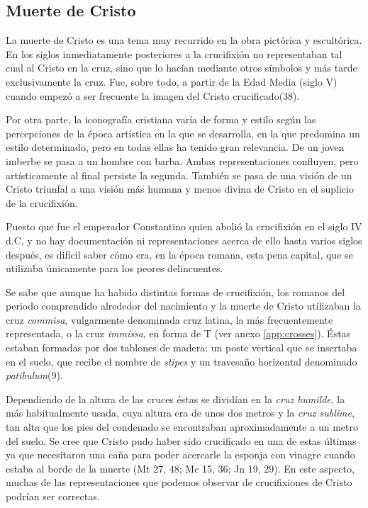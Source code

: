 \subsection{Muerte de Cristo}
La muerte de Cristo es una tema muy recurrido en la obra pictórica y escultórica. En los siglos inmediatamente posteriores a la crucifixión no representaban tal cual al Cristo en la cruz, sino que lo hacían mediante otros símbolos y más tarde exclusivamente la cruz. Fue, sobre todo, a partir de la Edad Media (siglo V) cuando empezó a ser frecuente la imagen del Cristo crucificado(38).

Por otra parte, la iconografía cristiana varía de forma y estilo según las percepciones de la época artística en la que se desarrolla, en la que predomina un estilo determinado, pero en todas ellas ha tenido gran relevancia. De un joven imberbe se pasa a un hombre con barba. Ambas representaciones confluyen, pero artísticamente al final persiste la segunda. También se pasa de una visión de un Cristo triunfal a una visión más humana y menos divina de Cristo en el suplicio de la crucifixión.

Puesto que fue el emperador Constantino quien abolió la crucifixión en el siglo IV d.C, y no hay documentación ni representaciones acerca de ello hasta varios siglos después, es difícil saber cómo era, en la época romana, esta pena capital, que se utilizaba únicamente para los peores delincuentes.

Se sabe que aunque ha habido distintas formas de crucifixión, los romanos del periodo comprendido alrededor del nacimiento y la muerte de Cristo utilizaban la cruz \textit{commisa}, vulgarmente denominada cruz latina, la más frecuentemente representada, o la cruz \textit{immissa}, en forma de T (ver anexo \autoref{app:crosses}). Éstas estaban formadas por dos tablones de madera: un poste vertical que se insertaba en el suelo, que recibe el nombre de \textit{stipes} y un travesaño horizontal denominado \textit{patibulum}(9).%

Dependiendo de la altura de las cruces éstas se dividían en la \textit{cruz humilde}, la más habitualmente usada, cuya altura era de unos dos metros y la \textit{cruz sublime}, tan alta que los pies del condenado se encontraban aproximadamente a un metro del suelo. Se cree que Cristo pudo haber sido crucificado en una de estas últimas ya que necesitaron una caña para poder acercarle la esponja con vinagre cuando estaba al borde de la muerte (Mt 27, 48; Mc 15, 36; Jn 19, 29). En este aspecto, muchas de las representaciones que podemos observar de crucifixiones de Cristo podrían ser correctas.

